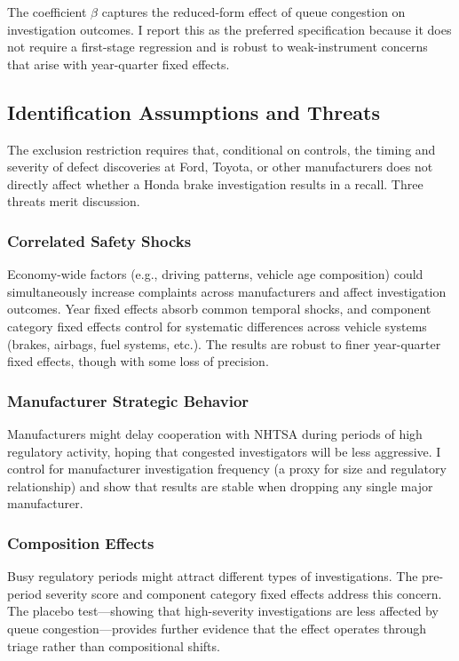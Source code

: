 \documentclass[12pt]{article}
\begin{document}
The coefficient $\beta$ captures the reduced-form effect of queue congestion on investigation outcomes. I report this as the preferred specification because it does not require a first-stage regression and is robust to weak-instrument concerns that arise with year-quarter fixed effects.

\subsection{Identification Assumptions and Threats}

The exclusion restriction requires that, conditional on controls, the timing and severity of defect discoveries at Ford, Toyota, or other manufacturers does not directly affect whether a Honda brake investigation results in a recall. Three threats merit discussion.

\subsubsection*{Correlated Safety Shocks} Economy-wide factors (e.g., driving patterns, vehicle age composition) could simultaneously increase complaints across manufacturers and affect investigation outcomes. Year fixed effects absorb common temporal shocks, and component category fixed effects control for systematic differences across vehicle systems (brakes, airbags, fuel systems, etc.). The results are robust to finer year-quarter fixed effects, though with some loss of precision.

\subsubsection*{Manufacturer Strategic Behavior} Manufacturers might delay cooperation with NHTSA during periods of high regulatory activity, hoping that congested investigators will be less aggressive. I control for manufacturer investigation frequency (a proxy for size and regulatory relationship) and show that results are stable when dropping any single major manufacturer.

\subsubsection*{Composition Effects} Busy regulatory periods might attract different types of investigations. The pre-period severity score and component category fixed effects address this concern. The placebo test---showing that high-severity investigations are less affected by queue congestion---provides further evidence that the effect operates through triage rather than compositional shifts.
\end{document}
